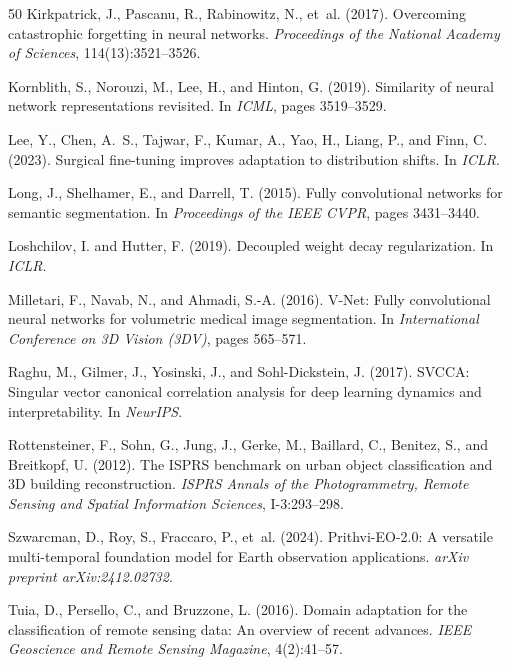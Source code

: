 \documentclass[11pt,a4paper]{report}
\begin{document}
\begin{thebibliography}{50}
Kirkpatrick, J., Pascanu, R., Rabinowitz, N., et~al. (2017).
Overcoming catastrophic forgetting in neural networks.
\emph{Proceedings of the National Academy of Sciences}, 114(13):3521--3526.

Kornblith, S., Norouzi, M., Lee, H., and Hinton, G. (2019).
Similarity of neural network representations revisited.
In \emph{ICML}, pages 3519--3529.

Lee, Y., Chen, A.~S., Tajwar, F., Kumar, A., Yao, H., Liang, P., and Finn, C. (2023).
Surgical fine-tuning improves adaptation to distribution shifts.
In \emph{ICLR}.

Long, J., Shelhamer, E., and Darrell, T. (2015).
Fully convolutional networks for semantic segmentation.
In \emph{Proceedings of the IEEE CVPR}, pages 3431--3440.

Loshchilov, I. and Hutter, F. (2019).
Decoupled weight decay regularization.
In \emph{ICLR}.

Milletari, F., Navab, N., and Ahmadi, S.-A. (2016).
V-Net: Fully convolutional neural networks for volumetric medical image segmentation.
In \emph{International Conference on 3D Vision (3DV)}, pages 565--571.

Raghu, M., Gilmer, J., Yosinski, J., and Sohl-Dickstein, J. (2017).
SVCCA: Singular vector canonical correlation analysis for deep learning dynamics and interpretability.
In \emph{NeurIPS}.

Rottensteiner, F., Sohn, G., Jung, J., Gerke, M., Baillard, C., Benitez, S., and Breitkopf, U. (2012).
The ISPRS benchmark on urban object classification and 3D building reconstruction.
\emph{ISPRS Annals of the Photogrammetry, Remote Sensing and Spatial Information Sciences}, I-3:293--298.

Szwarcman, D., Roy, S., Fraccaro, P., et~al. (2024).
Prithvi-EO-2.0: A versatile multi-temporal foundation model for Earth observation applications.
\emph{arXiv preprint arXiv:2412.02732}.

Tuia, D., Persello, C., and Bruzzone, L. (2016).
Domain adaptation for the classification of remote sensing data: An overview of recent advances.
\emph{IEEE Geoscience and Remote Sensing Magazine}, 4(2):41--57.


\end{thebibliography}
\end{document}
